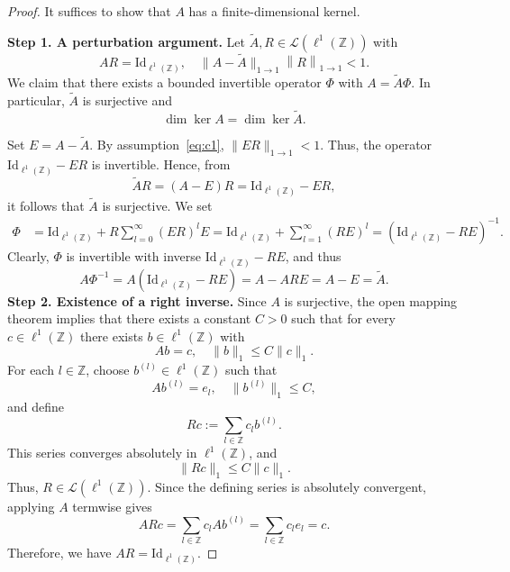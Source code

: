 \documentclass[10pt,a4paper]{amsart}
\def\Z{{\mathbb Z}}
\newcommand{\norm}[1]{\left\lVert #1 \right\rVert}
\begin{document}
\begin{proof}
It suffices to show that $A$ has a finite-dimensional kernel.

\textbf{Step 1. A perturbation argument.}
Let $\tilde{A},R\in \mathcal{L}(\ell^1(\Z))$ with
\begin{equation} \label{eq:c1}
    AR=\mathrm{Id}_{\ell^1(\Z)},\quad \|A-\tilde{A}\|_{1\to 1} \norm{R}_{1\to 1} <1.
\end{equation}
We claim that there exists a bounded invertible operator $\Phi$ with $A=\tilde{A}\Phi$. In particular, $\tilde{A}$ is surjective and
\begin{equation}\label{eq:same_kernel}
    \dim \ker A= \dim\ker \tilde{A} .
\end{equation}

Set $E=A-\tilde{A}$. By assumption~\eqref{eq:c1}, $\|ER\|_{1\to 1}<1$. 
Thus, the operator $\mathrm{Id}_{\ell^1(\Z)}- ER$ is invertible. Hence, from 
\begin{equation}
    \tilde{A}R = (A- E)R =\mathrm{Id}_{\ell^1(\Z)} -  ER,
\end{equation}
it follows that $\tilde{A}$ is surjective.
We set 
\begin{align}
    \Phi & = \mathrm{Id}_{\ell^1(\Z)} +R\sum\limits_{l=0}^\infty (ER)^l E
     = \mathrm{Id}_{\ell^1(\Z)} +\sum\limits_{l=1}^\infty (RE)^l = (\mathrm{Id}_{\ell^1(\Z)} -RE)^{-1}.
\end{align}
Clearly, $\Phi$ is invertible with inverse $\mathrm{Id}_{\ell^1(\Z)}
-RE$, and thus 
\begin{equation}
    A\Phi^{-1} = A(\mathrm{Id}_{\ell^1(\Z)} -RE) = A- ARE = A-E = \tilde{A}.
\end{equation}
\textbf{Step 2. Existence of a right inverse. }
Since $A$ is surjective, the open mapping theorem implies that there exists a constant
$C>0$ such that for every $c\in {\ell^1(\Z)}$ there exists $b\in {\ell^1(\Z)}$ with
$$
Ab=c,
\quad
\|b\|_1\leq C\|c\|_1 .
$$
For each $l\in\mathbb Z$, choose $b^{(l)}\in {\ell^1(\Z)}$ such that
$$
Ab^{(l)}=e_l,
\quad
\|b^{(l)}\|_1\leq C,
$$
and define
$$
Rc:=\sum_{l\in\mathbb Z}c_l b^{(l)} .
$$
This series converges absolutely in ${\ell^1(\Z)}$, and
$$
\|Rc\|_1\leq C\|c\|_1 .
$$
Thus, $R\in\mathcal L({\ell^1(\Z)})$. Since the defining series is absolutely
convergent, applying $A$ termwise gives
$$
ARc=\sum_{l\in\mathbb Z}c_lAb^{(l)}
=\sum_{l\in\mathbb Z}c_le_l
=c.
$$
Therefore, we have $AR=\mathrm{Id}_{\ell^1(\Z)}$.


\end{proof}
\end{document}
